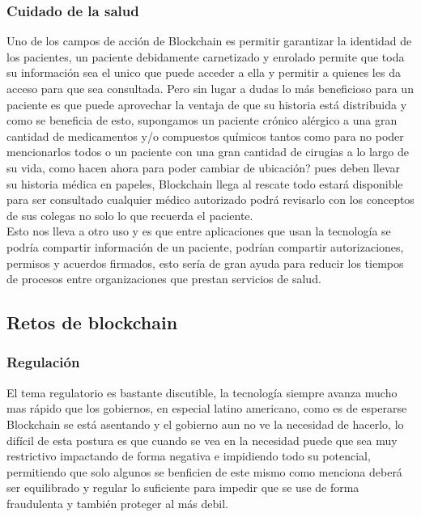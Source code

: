 \subsubsection{Cuidado de la salud}
Uno de los campos de acción de Blockchain es permitir garantizar la identidad de los pacientes, un paciente debidamente carnetizado y enrolado permite que toda su información sea el unico que puede acceder a ella y permitir a quienes les da acceso para que sea consultada. \citep{angraal2017blockchain} Pero sin lugar a dudas lo más beneficioso para un paciente es que puede aprovechar la ventaja de que su historia está distribuida y como se beneficia de esto, supongamos un paciente crónico alérgico a una gran cantidad de medicamentos y/o compuestos químicos tantos como para no poder mencionarlos todos o un paciente con una gran cantidad de cirugias a lo largo de su vida, como hacen ahora para poder cambiar de ubicación? pues deben llevar su historia médica en papeles, Blockchain llega al rescate todo estará disponible para ser consultado cualquier médico autorizado podrá revisarlo con los conceptos de sus colegas no solo lo que recuerda el paciente.
\\
Esto nos lleva a otro uso y es que entre aplicaciones que usan la tecnología se podría compartir información de un paciente, podrían compartir autorizaciones, permisos y acuerdos firmados, esto sería de gran ayuda para reducir los tiempos de procesos entre organizaciones que prestan servicios de salud. \citep{angraal2017blockchain}

\subsection{Retos de blockchain}
\subsubsection{Regulación}
El tema regulatorio es bastante discutible, la tecnología siempre avanza mucho mas rápido que los gobiernos, en especial latino americano, como es de esperarse Blockchain se está asentando y el gobierno aun no ve la necesidad de hacerlo, lo difícil de esta postura es que cuando se vea en la necesidad puede que sea muy restrictivo impactando de forma negativa e impidiendo todo su potencial\citep{banafa2017Blockchain}, permitiendo que solo algunos se benficien de este mismo como menciona \citep{cabral2018EstadoArte} deberá ser equilibrado y regular lo suficiente para impedir que se use de forma fraudulenta y también proteger al más debil. 
